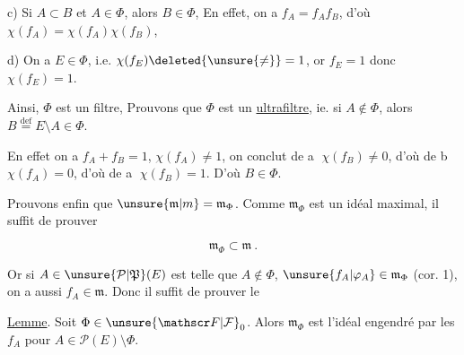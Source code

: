 c) Si $A\subset B$ et $A\in\Phi$, alors $B\in\Phi$,    En effet, on a $f_A=f_A f_B$, d'où $\chi(f_A)=\chi(f_A)\chi(f_B)$, 

 d) On a $E\in\Phi$, i.e. $\chi(f_E)\deleted{\unsure{\ne}}=1$, or $f_E=1$ donc $\chi(f_E)=1$. 

Ainsi, $\Phi$ est un filtre,       Prouvons que   $\Phi$ est un \uline{ultrafiltre}, ie.  si $A\notin\Phi$, alors $B\overset{\mathrm{def}}{=}E\setminus A\in\Phi$.

En effet on a  $f_A+f_B=1$,     $\chi(f_A)\ne1$, on conclut de \textcircled{a} $\chi(f_B)\ne0$, d'où de \textcircled{b} $\chi(f_A)=0$, d'où de \textcircled{a} $\chi(f_B)=1$. D'où $B\in\Phi$.



Prouvons enfin que $\unsure{\mathfrak m|m}=\mathfrak m_\Phi$. Comme $\mathfrak m_\Phi$ est un idéal maximal, il suffit de prouver

\[
\mathfrak m_\Phi\subset\mathfrak m\ .
\]

Or si $A\in\unsure{\mathcal P|\mathfrak P}(E)$ est telle que $A\notin\Phi$,   $\unsure{f_A|\varphi_A}\in\mathfrak m_\Phi$ \deleted{\unsure{$=$}} (cor. 1), on a aussi $f_A\in\mathfrak m$. Donc il suffit de prouver le

\uline{Lemme}. Soit $\Phi\in\unsure{\mathscr F|\mathcal F}_0$. Alors $\mathfrak m_\Phi$ est  l'idéal engendré par les $f_A$ pour $A\in\mathcal P(E)\setminus\Phi$.

